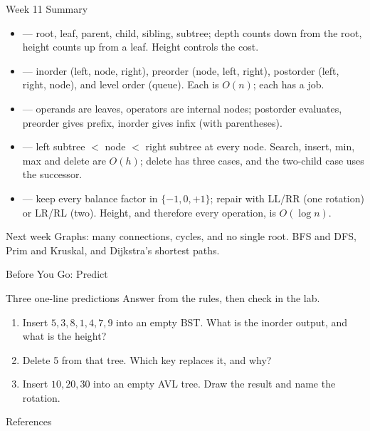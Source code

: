 \documentclass[aspectratio=169]{beamer}
\begin{document}
\begin{frame}{Week 11 Summary}
  \begin{itemize}
    \item {} --- root, leaf, parent, child, sibling,
      subtree; depth counts down from the root, height counts up from a
      leaf. Height controls the cost.
    \item {} --- inorder (left, node, right), preorder (node,
      left, right), postorder (left, right, node), and level order (queue).
      Each is $O(n)$; each has a job.
    \item {} --- operands are leaves, operators are
      internal nodes; postorder evaluates, preorder gives prefix, inorder
      gives infix (with parentheses).
    \item {} --- left subtree $<$ node $<$ right subtree at every
      node. Search, insert, min, max and delete are $O(h)$; delete has
      three cases, and the two-child case uses the successor.
    \item {} --- keep every balance factor in $\{-1,0,+1\}$; repair
      with LL/RR (one rotation) or LR/RL (two). Height, and therefore every
      operation, is $O(\log n)$.
  \end{itemize}
  \begin{exampleblock}{Next week}
    Graphs: many connections, cycles, and no single root. BFS and DFS,
    Prim and Kruskal, and Dijkstra's shortest paths.
  \end{exampleblock}
\end{frame}

\begin{frame}{Before You Go: Predict}
  \begin{block}{Three one-line predictions}
    Answer from the rules, then check in the lab.
  \end{block}
  \begin{enumerate}
    \item Insert $5,3,8,1,4,7,9$ into an empty BST. What is the inorder
      output, and what is the height?
    \item Delete 5 from that tree. Which key replaces it, and why?
    \item Insert $10,20,30$ into an empty AVL tree. Draw the result and name
      the rotation.
  \end{enumerate}
\end{frame}

\begin{frame}[allowframebreaks]{References}
  \tiny
  
  
\end{frame}
\end{document}

